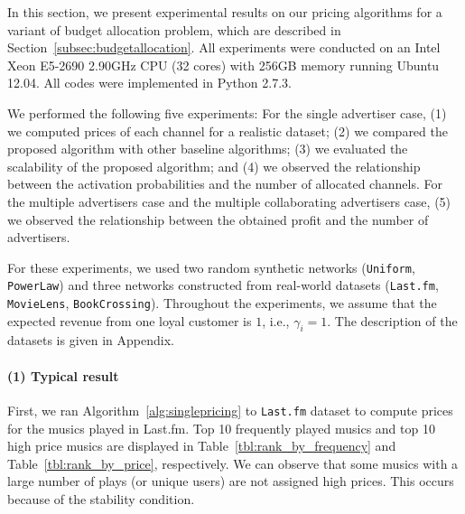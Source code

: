 \documentclass[letterpaper]{article}
\theoremstyle{definition}
\begin{document}
In this section, we present experimental results on our pricing algorithms
for a variant of budget allocation problem, which are described in Section~\ref{subsec:budgetallocation}.
%
All experiments were conducted on an Intel Xeon E5-2690
2.90GHz CPU (32 cores) with 256GB memory running Ubuntu 12.04.
All codes were implemented in Python 2.7.3.

We performed the following five experiments:
For the single advertiser case,
(1) we computed prices of each channel for a realistic dataset;
(2) we compared the proposed algorithm with other baseline algorithms;
(3) we evaluated the scalability of the proposed algorithm; and
(4) we observed the relationship between the activation probabilities and the number of allocated channels. %
For the multiple advertisers case and the multiple collaborating advertisers case,
(5) we observed the relationship between the obtained profit and the number of advertisers.



%
For these experiments, we used two random synthetic networks (\texttt{Uniform}, \texttt{PowerLaw}) and three networks constructed from real-world datasets (\texttt{Last.fm}, \texttt{MovieLens}, \texttt{BookCrossing}).
Throughout the experiments, we assume that the expected revenue from one loyal customer is $1$, i.e., $\gamma_i=1$.
The description of the datasets is given in Appendix.

\paragraph{(1) Typical result}

First, we ran Algorithm~\ref{alg:singlepricing}
to \texttt{Last.fm} dataset to compute prices for the musics played in Last.fm.
Top 10 frequently played musics and top 10 high price musics
are displayed in Table~\ref{tbl:rank_by_frequency} and Table~\ref{tbl:rank_by_price}, respectively.
We can observe that some musics with a large number of plays (or unique users) are not assigned high prices.
This occurs because of the stability condition.
\end{document}
